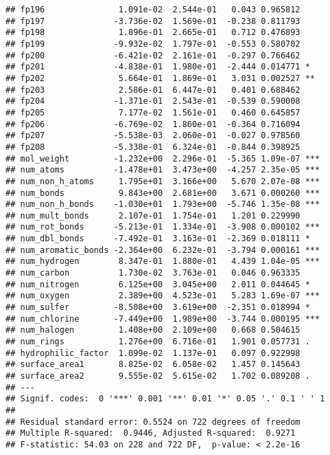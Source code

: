 \documentclass[
]{article}
\newenvironment{Shaded}{\begin{snugshade}}{\end{snugshade}}
\newcommand{\DataTypeTok}[1]{\textcolor[rgb]{0.13,0.29,0.53}{#1}}
\newcommand{\DecValTok}[1]{\textcolor[rgb]{0.00,0.00,0.81}{#1}}
\newcommand{\KeywordTok}[1]{\textcolor[rgb]{0.13,0.29,0.53}{\textbf{#1}}}
\newcommand{\NormalTok}[1]{#1}
\newcommand{\OperatorTok}[1]{\textcolor[rgb]{0.81,0.36,0.00}{\textbf{#1}}}
\newcommand{\StringTok}[1]{\textcolor[rgb]{0.31,0.60,0.02}{#1}}
\begin{document}
\begin{verbatim}
## fp196               1.091e-02  2.544e-01   0.043 0.965812    
## fp197              -3.736e-02  1.569e-01  -0.238 0.811793    
## fp198               1.896e-01  2.665e-01   0.712 0.476893    
## fp199              -9.932e-02  1.797e-01  -0.553 0.580702    
## fp200              -6.421e-02  2.161e-01  -0.297 0.766462    
## fp201              -4.838e-01  1.980e-01  -2.444 0.014771 *  
## fp202               5.664e-01  1.869e-01   3.031 0.002527 ** 
## fp203               2.586e-01  6.447e-01   0.401 0.688462    
## fp204              -1.371e-01  2.543e-01  -0.539 0.590008    
## fp205               7.177e-02  1.561e-01   0.460 0.645857    
## fp206              -6.769e-02  1.860e-01  -0.364 0.716094    
## fp207              -5.538e-03  2.060e-01  -0.027 0.978560    
## fp208              -5.338e-01  6.324e-01  -0.844 0.398925    
## mol_weight         -1.232e+00  2.296e-01  -5.365 1.09e-07 ***
## num_atoms          -1.478e+01  3.473e+00  -4.257 2.35e-05 ***
## num_non_h_atoms     1.795e+01  3.166e+00   5.670 2.07e-08 ***
## num_bonds           9.843e+00  2.681e+00   3.671 0.000260 ***
## num_non_h_bonds    -1.030e+01  1.793e+00  -5.746 1.35e-08 ***
## num_mult_bonds      2.107e-01  1.754e-01   1.201 0.229990    
## num_rot_bonds      -5.213e-01  1.334e-01  -3.908 0.000102 ***
## num_dbl_bonds      -7.492e-01  3.163e-01  -2.369 0.018111 *  
## num_aromatic_bonds -2.364e+00  6.232e-01  -3.794 0.000161 ***
## num_hydrogen        8.347e-01  1.880e-01   4.439 1.04e-05 ***
## num_carbon          1.730e-02  3.763e-01   0.046 0.963335    
## num_nitrogen        6.125e+00  3.045e+00   2.011 0.044645 *  
## num_oxygen          2.389e+00  4.523e-01   5.283 1.69e-07 ***
## num_sulfer         -8.508e+00  3.619e+00  -2.351 0.018994 *  
## num_chlorine       -7.449e+00  1.989e+00  -3.744 0.000195 ***
## num_halogen         1.408e+00  2.109e+00   0.668 0.504615    
## num_rings           1.276e+00  6.716e-01   1.901 0.057731 .  
## hydrophilic_factor  1.099e-02  1.137e-01   0.097 0.922998    
## surface_area1       8.825e-02  6.058e-02   1.457 0.145643    
## surface_area2       9.555e-02  5.615e-02   1.702 0.089208 .  
## ---
## Signif. codes:  0 '***' 0.001 '**' 0.01 '*' 0.05 '.' 0.1 ' ' 1
## 
## Residual standard error: 0.5524 on 722 degrees of freedom
## Multiple R-squared:  0.9446, Adjusted R-squared:  0.9271 
## F-statistic: 54.03 on 228 and 722 DF,  p-value: < 2.2e-16
\end{verbatim}

\begin{Shaded}
\end{Shaded}
\end{document}

